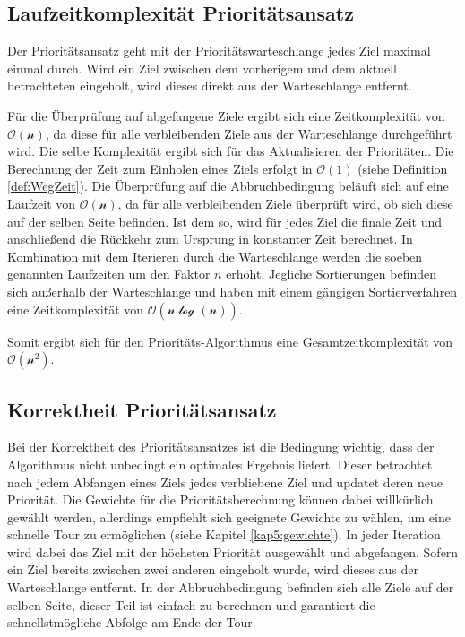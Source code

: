 \documentclass[german,version-2019-11]{uzl-thesis}
\begin{document}
\subsection{Laufzeitkomplexität Prioritätsansatz}

Der Prioritätsansatz geht mit der Prioritätswarteschlange jedes Ziel maximal einmal durch. Wird ein Ziel zwischen dem vorherigem und dem aktuell betrachteten eingeholt, wird dieses direkt aus der Warteschlange entfernt. 

Für die Überprüfung auf abgefangene Ziele ergibt sich eine Zeitkomplexität von $\mathcal{O(n)}$, da diese für alle verbleibenden Ziele aus der Warteschlange durchgeführt wird. Die selbe Komplexität ergibt sich für das Aktualisieren der Prioritäten. Die Berechnung der Zeit zum Einholen eines Ziels erfolgt in $\mathcal{O(1)}$ (siehe Definition \ref{def:WegZeit}). Die Überprüfung auf die Abbruchbedingung beläuft sich auf eine Laufzeit von $\mathcal{O(n)}$, da für alle verbleibenden Ziele überprüft wird, ob sich diese auf der selben Seite befinden. Ist dem so, wird für jedes Ziel die finale Zeit und anschließend die Rückkehr zum Ursprung in konstanter Zeit berechnet. In Kombination mit dem Iterieren durch die Warteschlange werden die soeben genannten Laufzeiten um den Faktor $n$ erhöht. Jegliche Sortierungen befinden sich außerhalb der Warteschlange und haben mit einem gängigen Sortierverfahren \cite{kaaser2014algorithmen} eine Zeitkomplexität von $\mathcal{O(n\log(n))}$. 

Somit ergibt sich für den Prioritäts-Algorithmus eine Gesamtzeitkomplexität von $\mathcal{O(n^2)}$.

\subsection{Korrektheit Prioritätsansatz}
Bei der Korrektheit des Prioritätsansatzes ist die Bedingung wichtig, dass der Algorithmus nicht unbedingt ein optimales Ergebnis liefert. Dieser betrachtet nach jedem Abfangen eines Ziels jedes verbliebene Ziel und updatet deren neue Priorität. Die Gewichte für die Prioritätsberechnung können dabei willkürlich gewählt werden, allerdings empfiehlt sich geeignete Gewichte zu wählen, um eine schnelle Tour zu ermöglichen (siehe Kapitel \ref{kap5:gewichte}). In jeder Iteration wird dabei das Ziel mit der höchsten Priorität ausgewählt und abgefangen. Sofern ein Ziel bereits zwischen zwei anderen eingeholt wurde, wird dieses aus der Warteschlange entfernt. In der Abbruchbedingung befinden sich alle Ziele auf der selben Seite, dieser Teil ist einfach zu berechnen und garantiert die schnellstmögliche Abfolge am Ende der Tour. 
\end{document}
